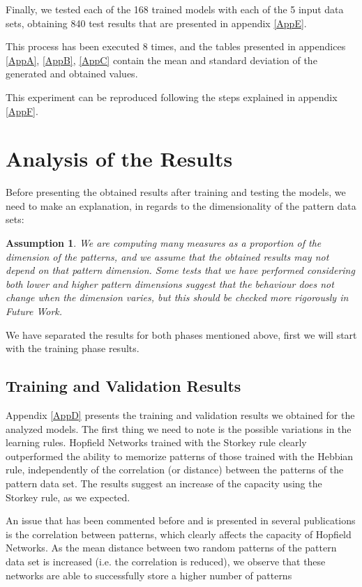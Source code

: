 \documentclass[anon]{CI}
\newtheorem*{assumption}{Assumption}
\begin{document}
Finally, we tested each of the 168 trained models with each of the 5 input data sets, obtaining 840 test results that are presented in appendix \ref{AppE}.

This process has been executed 8 times, and the tables presented in appendices \ref{AppA}, \ref{AppB}, \ref{AppC} contain the mean and standard deviation of the generated and obtained values.

This experiment can be reproduced following the steps explained in appendix \ref{AppF}.

\section{Analysis of the Results}

Before presenting the obtained results after training and testing the models, we need to make an explanation, in regards to the dimensionality of the pattern data sets:

\begin{assumption} We are computing many measures as a proportion of the dimension of the patterns, and we assume that the obtained results may not depend on that pattern dimension. Some tests that we have performed considering both lower and higher pattern dimensions suggest that the behaviour does not change when the dimension varies, but this should be checked more rigorously in Future Work.
\end{assumption}

We have separated the results for both phases mentioned above, first we will start with the training phase results.

\subsection{Training and Validation Results}
Appendix \ref{AppD} presents the training and validation results we obtained for the analyzed models. The first thing we need to note is the possible variations in the learning rules. Hopfield Networks trained with the Storkey rule clearly outperformed the ability to memorize patterns of those trained with the Hebbian rule, independently of the correlation (or distance) between the patterns of the pattern data set. The results suggest an increase of the capacity using the Storkey rule, as we expected.

An issue that has been commented before and is presented in several publications is the correlation between patterns, which clearly affects the capacity of Hopfield Networks. As the mean distance between two random patterns of the pattern data set is increased (i.e. the correlation is reduced), we observe that these networks are able to successfully store a higher number of patterns 
\end{document}
